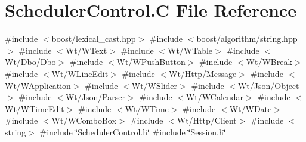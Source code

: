 \hypertarget{_scheduler_control_8_c}{}\section{Scheduler\+Control.\+C File Reference}
\label{_scheduler_control_8_c}
{\ttfamily \#include $<$boost/lexical\+\_\+cast.\+hpp$>$}\newline
{\ttfamily \#include $<$boost/algorithm/string.\+hpp$>$}\newline
{\ttfamily \#include $<$Wt/\+W\+Text$>$}\newline
{\ttfamily \#include $<$Wt/\+W\+Table$>$}\newline
{\ttfamily \#include $<$Wt/\+Dbo/\+Dbo$>$}\newline
{\ttfamily \#include $<$Wt/\+W\+Push\+Button$>$}\newline
{\ttfamily \#include $<$Wt/\+W\+Break$>$}\newline
{\ttfamily \#include $<$Wt/\+W\+Line\+Edit$>$}\newline
{\ttfamily \#include $<$Wt/\+Http/\+Message$>$}\newline
{\ttfamily \#include $<$Wt/\+W\+Application$>$}\newline
{\ttfamily \#include $<$Wt/\+W\+Slider$>$}\newline
{\ttfamily \#include $<$Wt/\+Json/\+Object$>$}\newline
{\ttfamily \#include $<$Wt/\+Json/\+Parser$>$}\newline
{\ttfamily \#include $<$Wt/\+W\+Calendar$>$}\newline
{\ttfamily \#include $<$Wt/\+W\+Time\+Edit$>$}\newline
{\ttfamily \#include $<$Wt/\+W\+Time$>$}\newline
{\ttfamily \#include $<$Wt/\+W\+Date$>$}\newline
{\ttfamily \#include $<$Wt/\+W\+Combo\+Box$>$}\newline
{\ttfamily \#include $<$Wt/\+Http/\+Client$>$}\newline
{\ttfamily \#include $<$string$>$}\newline
{\ttfamily \#include \char`\"{}Scheduler\+Control.\+h\char`\"{}}\newline
{\ttfamily \#include \char`\"{}Session.\+h\char`\"{}}\newline
